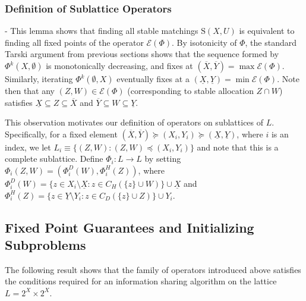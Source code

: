 \documentclass[11pt,reqno]{amsart}
\theoremstyle{definition}
\numberwithin{equation}{section}
\newcommand{\ol}{\overline}
\newcommand{\ul}{\underline}
\newcommand{\sub}{\subseteq}
\newcommand{\stable}{\mathrm{S}(X,U)}
\newcommand{\fix}{\mathcal{E}}
\newcommand{\suq}{\succeq}
\newcommand{\peq}{\preceq}
\newcommand{\lattice}{L}
\newcommand{\topx}{\ol{X}}
\newcommand{\topy}{\ol{Y}}
\newcommand{\botx}{\ul{X}}
\newcommand{\boty}{\ul{Y}}
\begin{document}
\subsubsection{Definition of Sublattice Operators} - This lemma shows that finding all stable matchings $\stable$ is equivalent to finding all fixed points of the operator $\fix(\Phi)$.
By isotonicity of $\Phi$, the standard Tarski argument from previous sections shows that the sequence formed by $\Phi^k(X, \emptyset)$ is monotonically decreasing, and fixes at $(\topx, \topy) = \max \fix(\Phi)$.
Similarly, iterating $\Phi^k(\emptyset, X)$ eventually fixes at a $(\botx, \boty) = \min \fix( \Phi)$.
Note then that any $(Z,W) \in \fix(\Phi)$ (corresponding to stable allocation $Z \cap W$) satisfies $\botx \sub Z \sub \topx$ and $\topy \sub W \sub \boty$.

This observation motivates our definition of operators on sublattices of $\lattice$.
Specifically, for a fixed element $(\topx, \topy) \suq (X_i, Y_i) \suq (\botx, \boty)$, where $i$ is an index, we let $\lattice_i \equiv \{(Z,W): (Z,W) \peq (X_i, Y_i) \}$ and note that this is a complete sublattice.
Define $\Phi_i: \lattice \to \lattice$ by setting $\Phi_i(Z,W) = (\Phi^D_i(W), \Phi^H_i(Z))$, where $\Phi^D_i(W) = \{z \in X_i \setminus \botx: z \in C_H(\{z\} \cup W) \} \cup \botx$ and $\Phi^H_i(Z) = \{z \in \boty \setminus Y_i: z \in C_D( \{z \} \cup Z ) \} \cup Y_i$.

\subsection{Fixed Point Guarantees and Initializing Subproblems}

The following result shows that the family of operators introduced above satisfies the conditions required for an information sharing algorithm on the lattice $\lattice = 2^X \times 2^X$. 
\end{document}
